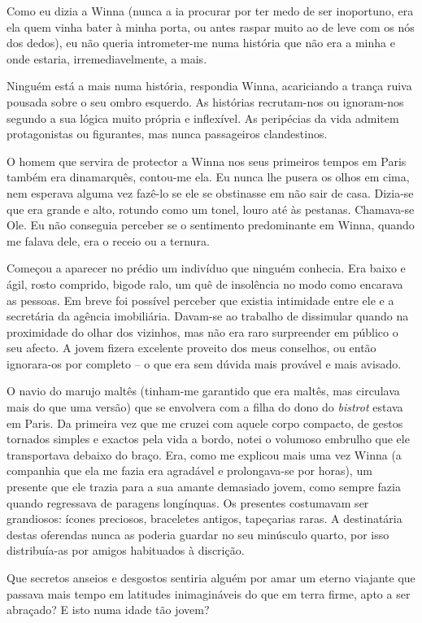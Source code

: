 Como eu dizia a Winna (nunca a ia procurar por ter medo de ser
inoportuno, era ela quem vinha bater à minha porta, ou antes raspar
muito ao de leve com os nós dos dedos), eu não queria intrometer-me numa
história que não era a minha e onde estaria, irremediavelmente, a mais.

Ninguém está a mais numa história, respondia Winna, acariciando a trança
ruiva pousada sobre o seu ombro esquerdo. As histórias recrutam-nos ou
ignoram-nos segundo a sua lógica muito própria e inflexível. As
peripécias da vida admitem protagonistas ou figurantes, mas nunca
passageiros clandestinos.

O homem que servira de protector a Winna nos seus primeiros tempos em
Paris também era dinamarquês, contou-me ela. Eu nunca lhe pusera os olhos em cima, nem esperava alguma vez
fazê-lo se ele se obstinasse em não sair de casa. Dizia-se que era
grande e alto, rotundo como um tonel, louro até às pestanas. Chamava-se
Ole. Eu não conseguia perceber se o sentimento predominante em Winna,
quando me falava dele, era o receio ou a ternura.

Começou a aparecer no prédio um indivíduo que ninguém conhecia. Era
baixo e ágil, rosto comprido, bigode ralo, um quê de insolência no modo
como encarava as pessoas. Em breve foi possível perceber que existia
intimidade entre ele e
a secretária da agência imobiliária. Davam-se ao trabalho de dissimular
quando na proximidade do olhar dos vizinhos, mas não era raro
surpreender em público o seu afecto. A jovem fizera excelente proveito
dos meus conselhos, ou então ignorara-os por completo -- o que era sem
dúvida mais provável e mais avisado.

O navio do marujo maltês (tinham-me garantido que era maltês, mas
circulava mais do que uma versão) que se envolvera com a filha do dono
do \emph{bistrot }estava em Paris. Da primeira vez que me cruzei com
aquele corpo compacto, de gestos tornados simples e exactos pela vida
a bordo, notei o volumoso embrulho que ele transportava debaixo do
braço. Era, como me explicou mais uma vez Winna (a companhia que ela me
fazia era agradável e prolongava-se por horas), um presente que ele
trazia para a sua amante demasiado jovem, como sempre fazia quando
regressava de paragens longínquas. Os presentes costumavam ser
grandiosos: ícones preciosos, braceletes antigos, tapeçarias raras. A
destinatária destas oferendas nunca as poderia guardar no seu minúsculo
quarto, por isso distribuía-as por amigos habituados à discrição.

Que secretos anseios e desgostos sentiria alguém por amar um eterno
viajante que passava mais tempo em latitudes inimagináveis do que em
terra firme, apto a ser abraçado? E isto numa idade tão jovem?

